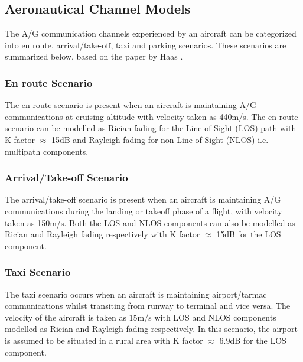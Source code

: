 
\subsection{Aeronautical Channel Models}
The A/G communication channels experienced by an aircraft can be categorized into en route, arrival/take-off, taxi and parking scenarios. These scenarios are summarized below, based on the paper by Haas \cite{haas2002aeronautical}.


\subsubsection{En route Scenario}
The en route scenario is present when an aircraft is maintaining A/G communications at cruising altitude with velocity taken as 440m/s. The en route scenario can be modelled as Rician fading for the Line-of-Sight (LOS) path with K factor $\approx$ 15dB and Rayleigh fading for non Line-of-Sight (NLOS) i.e. multipath components.


\subsubsection{Arrival/Take-off Scenario}

The arrival/take-off scenario is present when an aircraft is maintaining A/G communications during the landing or takeoff phase of a flight, with velocity taken as 150m/s. Both the LOS and NLOS components can also be modelled as Rician and Rayleigh fading respectively with K factor $\approx$ 15dB for the LOS component.


\subsubsection{Taxi Scenario}
The taxi scenario occurs when an aircraft is maintaining airport/tarmac communications whilst transiting from runway to terminal and vice versa. The velocity of the aircraft is taken as 15m/s with LOS and NLOS components modelled as Rician and Rayleigh fading respectively. In this scenario, the airport is assumed to be situated in a rural area with K factor $\approx$ 6.9dB for the LOS component.

